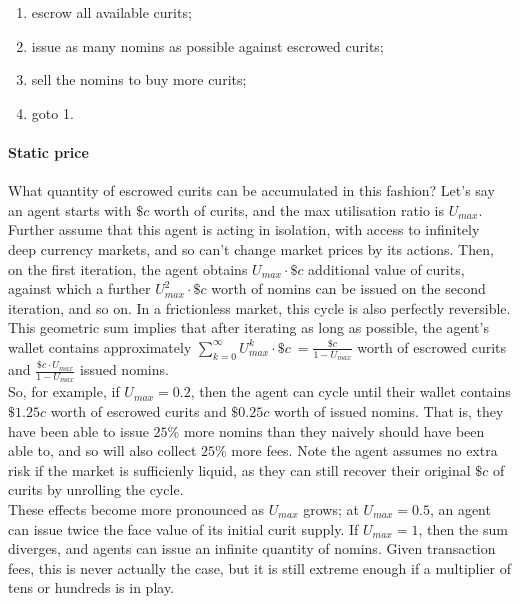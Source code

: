 \begin{enumerate}
    \item escrow all available curits;
    \item issue as many nomins as possible against escrowed curits;
    \item sell the nomins to buy more curits;
    \item goto 1.
\end{enumerate}

\paragraph{Static price}
What quantity of escrowed curits can be accumulated in this fashion?
Let's say an agent starts with \(\$c\) worth of curits, and the max utilisation ratio is \(U_{max}\).
Further assume that this agent is acting in isolation, with access to infinitely deep currency markets,
and so can't change market prices by its actions.
Then, on the first iteration, the agent obtains \(U_{max} \cdot \$c\) additional value of curits, against which
a further \(U_{max}^2 \cdot \$c\) worth of nomins can be issued on the second iteration,
and so on. In a frictionless market, this cycle is also perfectly reversible. \\

This geometric sum implies that after iterating as long as possible, the agent's wallet
contains approximately \(\sum_{k=0}^{\infty} {U_{max}^k \cdot \$c}\ = \frac{\$c}{1  - U_{max}}\)
worth of escrowed curits and \(\frac{\$c \cdot U_{max}}{1  - U_{max}}\) issued nomins.\\
So, for example, if \(U_{max} = 0.2\), then the agent can cycle until their
wallet contains \(\$1.25c\) worth of escrowed curits and \(\$0.25c\) worth of issued nomins.
That is, they have been able to issue \(25\%\) more nomins than they naively should
have been able to, and so will also collect \(25\%\) more fees.
Note the agent assumes no extra risk if the market is sufficienly liquid,
as they can still recover their original \(\$c\) of curits by unrolling the cycle. \\

These effects become more pronounced as \(U_{max}\) grows; at \(U_{max} = 0.5\),
an agent can issue twice the face value of its initial curit supply.
If \(U_{max} = 1\), then the sum diverges, and agents can issue an infinite
quantity of nomins. Given transaction fees, this is never actually the case,
but it is still extreme enough if a multiplier of tens or hundreds is in play. \\

